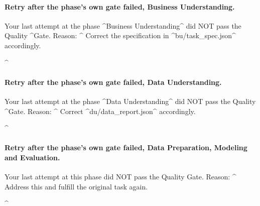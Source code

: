 \par\vspace{0pt plus 8\baselineskip}\vspace{0pt plus -8\baselineskip}
\paragraph{Retry after the phase's own gate failed, Business Understanding.}\leavevmode
\begin{AppCPrompt}
Your last attempt at the phase \AppCQ@^Business Understanding\AppCQ@^ did NOT pass the Quality
\AppCCont@^Gate.
Reason: ^
Correct the specification in \AppCQ@^bu/task_spec.json\AppCQ@^ accordingly.

\AppCRest@^
\end{AppCPrompt}
\par\vspace{0pt plus 8\baselineskip}\vspace{0pt plus -8\baselineskip}
\paragraph{Retry after the phase's own gate failed, Data Understanding.}\leavevmode
\begin{AppCPrompt}
Your last attempt at the phase \AppCQ@^Data Understanding\AppCQ@^ did NOT pass the Quality
\AppCCont@^Gate.
Reason: ^
Correct \AppCQ@^du/data_report.json\AppCQ@^ accordingly.

\AppCRest@^
\end{AppCPrompt}
\par\vspace{0pt plus 8\baselineskip}\vspace{0pt plus -8\baselineskip}
\paragraph{Retry after the phase's own gate failed, Data Preparation, Modeling and Evaluation.}\leavevmode
\begin{AppCPrompt}
Your last attempt at this phase did NOT pass the Quality Gate.
Reason: ^
Address this and fulfill the original task again.

\AppCRest@^
\end{AppCPrompt}
\par\vspace{0pt plus 8\baselineskip}\vspace{0pt plus -8\baselineskip}
